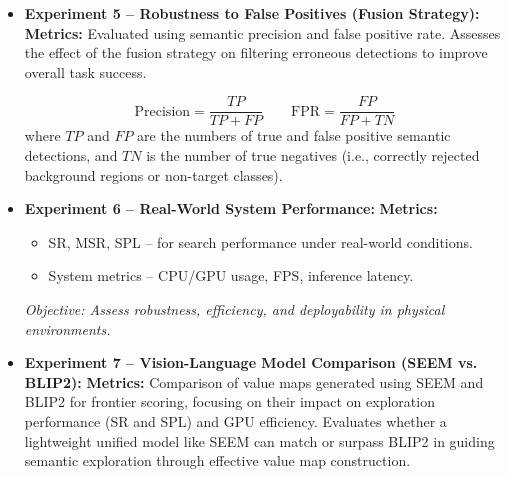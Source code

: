 \begin{itemize}
    \item \textbf{Experiment 5 – Robustness to False Positives (Fusion Strategy):}  
    \textbf{Metrics:} Evaluated using semantic precision and false positive rate. Assesses the effect of the fusion strategy on filtering erroneous detections to improve overall task success.

    \[
    \text{Precision} = \frac{TP}{TP + FP}
    \quad\quad
    \text{FPR} = \frac{FP}{FP + TN}
    \]
    where \( TP \) and \( FP \) are the numbers of true and false positive semantic detections, and \( TN \) is the number of true negatives (i.e., correctly rejected background regions or non-target classes).

    \item \textbf{Experiment 6 – Real-World System Performance:}  
    \textbf{Metrics:}
    \begin{itemize}
        \item SR, MSR, SPL – for search performance under real-world conditions.
        \item System metrics – CPU/GPU usage, FPS, inference latency.
    \end{itemize}
    \textit{Objective: Assess robustness, efficiency, and deployability in physical environments.}

    \item \textbf{Experiment 7 – Vision-Language Model Comparison (SEEM vs. BLIP2):}  
    \textbf{Metrics:} Comparison of value maps generated using SEEM and BLIP2 for frontier scoring, focusing on their impact on exploration performance (SR and SPL) and GPU efficiency. Evaluates whether a lightweight unified model like SEEM can match or surpass BLIP2 in guiding semantic exploration through effective value map construction.
\end{itemize}